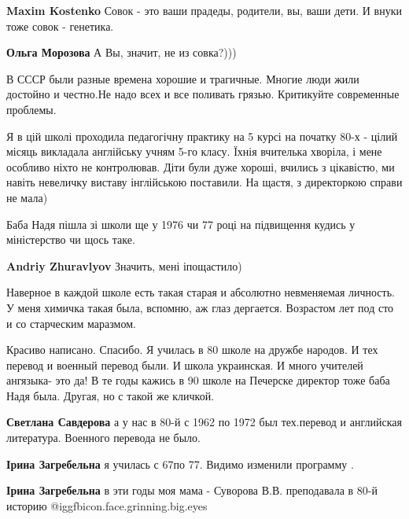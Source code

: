 \begin{itemize}
\begin{itemize}
\begin{itemize}
\textbf{Maxim Kostenko} Совок - это ваши прадеды, родители, вы, ваши дети. И внуки тоже совок - генетика.

\textbf{Ольга Морозова} А Вы, значит, не из совка?)))


В СССР были разные времена хорошие и трагичные. Многие люди жили достойно и
честно.Не надо всех и все поливать грязью. Критикуйте современные проблемы.

\end{itemize} %

\end{itemize} %


Я в цій школі проходила педагогічну практику на 5 курсі на початку 80-х - цілий
місяць викладала англійську учням 5-го класу. Їхнія вчителька хворіла, і мене
особливо ніхто не контролював. Діти були дуже хороші, вчились з цікавістю, ми
навіть невеличку виставу інглійською поставили. На щастя, з директоркою справи
не мала)

\begin{itemize} %
Баба Надя пішла зі школи ще у 1976 чи 77 році на підвищення кудись у міністерство чи щось таке.

\textbf{Andriy Zhuravlyov} Значить, мені іпощастило)
\end{itemize} %

Наверное в каждой школе есть такая старая и абсолютно невменяемая личность.
У меня химичка такая была, вспомню, аж глаз дергается. Возрастом лет под сто и со старческим маразмом.


Красиво написано. Спасибо. Я училась в 80 школе на дружбе народов. И тех
перевод и военный перевод были. И школа украинская. И много учителей
ангязыка- это да! В те годы кажись в 90 школе на Печерске директор тоже баба
Надя была. Другая, но с такой же кличкой.

\begin{itemize} %
\textbf{Светлана Савдерова} а у нас в 80-й с 1962 по 1972 был тех.перевод и английская литература. Военного перевода не было.

\textbf{Ірина Загребельна} я училась с 67по 77. Видимо изменили программу .

\textbf{Ірина Загребельна} в эти годы моя мама - Суворова В.В. преподавала в 80-й историю @igg{fbicon.face.grinning.big.eyes} 


\end{itemize}
\end{itemize}
